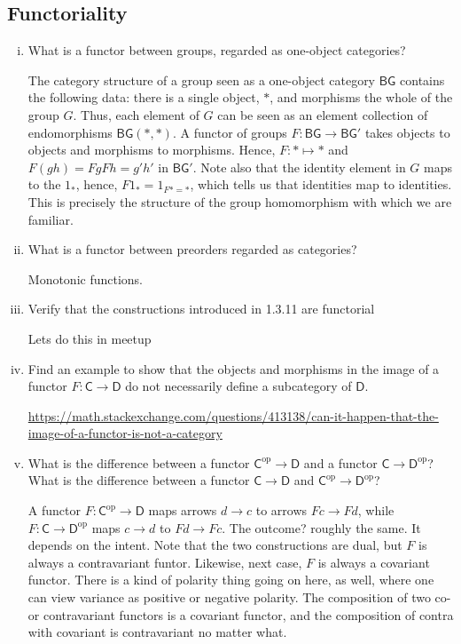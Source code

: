 \documentclass[10pt, oneside]{article}   	%
\newcommand{\cat}[1]{\bm{ \mathsf{#1} }}
\newcommand{\cc}{\cat{C}}
\newcommand{\dd}{\cat{D}}
\newcommand{\op}[1]{#1^{\text{op}}}
\newcommand{\opc}{\op{\cc}}
\newcommand{\opd}{\op{\dd}}
\begin{document}
\subsection{Functoriality}


\begin{enumerate}[(i)]

\item What is a functor between groups, regarded as one-object categories?

The category structure of a group seen as a one-object category $\cat{BG}$ contains the following data: there is a single object, $*$, and morphisms the whole of the group $G$. Thus, each element of $G$ can be seen as an element collection of endomorphisms $\cat{BG}(*,*)$. A functor of groups $F: \cat{BG} \to \cat{BG'}$ takes objects to objects and morphisms to morphisms. Hence, $F : * \mapsto *$ and $F(gh) = FgFh = g'h'$ in $\cat{BG'}$. Note also that the identity element in $G$ maps to the $1_*$, hence, $F1_* = 1_{F* = *}$, which tells us that identities map to identities. This is precisely the structure of the group homomorphism with which we are familiar.

\item What is a functor between preorders regarded as categories? 

Monotonic functions. 

\item Verify that the constructions introduced in 1.3.11 are functorial 

Lets do this in meetup

\item Find an example to show that the objects and morphisms in the image of a functor $F : \cc \to \dd$ do not necessarily define a subcategory of $\dd$. 

\href{This MO question}{https://math.stackexchange.com/questions/413138/can-it-happen-that-the-image-of-a-functor-is-not-a-category}


\item What is the difference between a functor $\opc \to \dd$ and a functor $\cc \to \opd$? What is the difference between a functor $\cc \to \dd$ and $\opc \to \opd$?

A functor $F : \opc \to \dd$ maps arrows $d \to c$ to arrows $Fc \to Fd$, while $F : \cc \to \opd$ maps $c \to d$ to $Fd \to Fc$. The outcome? roughly the same. It depends on the intent. Note that the two constructions are dual, but $F$ is always a contravariant funtor. Likewise, next case, $F$ is always a covariant functor. There is a kind of polarity thing going on here, as well, where one can view variance as positive or negative polarity. The composition of two co- or contravariant functors is a covariant functor, and the composition of contra with covariant is contravariant no matter what. 


\end{enumerate}
\end{document}
